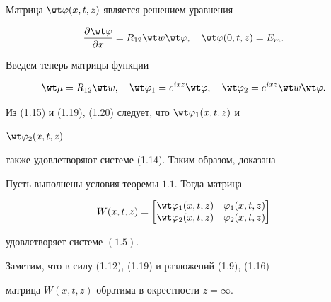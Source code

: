 Матрица $\wt\varphi(x,t,z)$ является решением уравнения 


\begin{equation} 


\myfrac{\wt\varphi}{x}=R_{12}\wt w\wt\varphi,\quad 


\wt\varphi(0,t,z)=E_m. 


\end{equation} 


Введем теперь матрицы-функции 


\begin{equation} 


\wt\mu=R_{12}\wt w,\quad \wt\varphi_1=e^{ixz}\wt\varphi, 


\quad \wt\varphi_2=e^{ixz}\wt w\wt\varphi. 


\end{equation} 


Из (1.15) и (1.19), (1.20) следует, что $\wt\varphi_1(x,t,z)$ и 


$\wt\varphi_2(x,t,z)$ 


также удовлетворяют системе (1.14). Таким образом, доказана 


 


\begin{thms} Пусть выполнены условия теоремы $1.1$. Тогда матрица 


\begin{equation} 


W(x,t,z)= 


\begin{bmatrix} 


\wt\varphi_1(x,t,z)& \varphi_1(x,t,z) \\ 


\wt\varphi_2(x,t,z) & \varphi_2(x,t,z) 


\end{bmatrix} 


\end{equation} 


удовлетворяет системе $(1.5)$. 


\end{thms} 


 


Заметим, что в силу (1.12), (1.19) и разложений (1.9), (1.16) 


матрица $W(x,t,z)$ обратима в окрестности $z=\infty$. 


 


